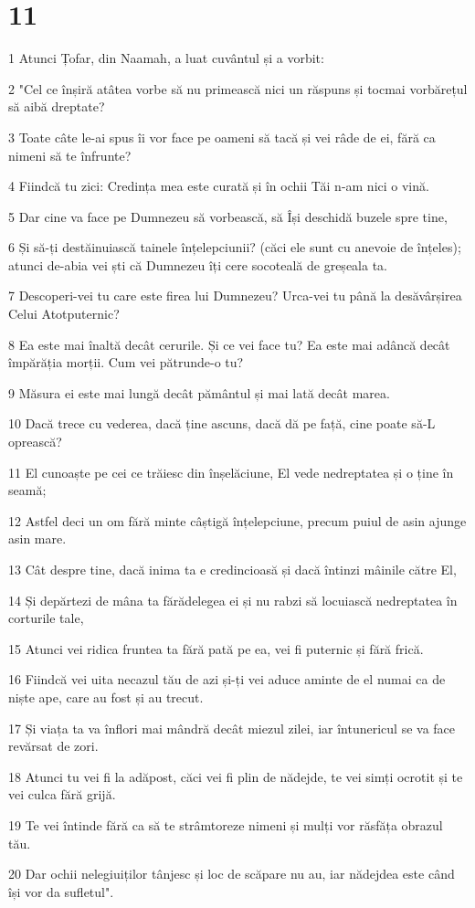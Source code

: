 \chapter{11}

\par 1 Atunci Țofar, din Naamah, a luat cuvântul și a vorbit:
\par 2 "Cel ce înșiră atâtea vorbe să nu primească nici un răspuns și tocmai vorbărețul să aibă dreptate?
\par 3 Toate câte le-ai spus îi vor face pe oameni să tacă și vei râde de ei, fără ca nimeni să te înfrunte?
\par 4 Fiindcă tu zici: Credința mea este curată și în ochii Tăi n-am nici o vină.
\par 5 Dar cine va face pe Dumnezeu să vorbească, să Își deschidă buzele spre tine,
\par 6 Și să-ți destăinuiască tainele înțelepciunii? (căci ele sunt cu anevoie de înțeles); atunci de-abia vei ști că Dumnezeu îți cere socoteală de greșeala ta.
\par 7 Descoperi-vei tu care este firea lui Dumnezeu? Urca-vei tu până la desăvârșirea Celui Atotputernic?
\par 8 Ea este mai înaltă decât cerurile. Și ce vei face tu? Ea este mai adâncă decât împărăția morții. Cum vei pătrunde-o tu?
\par 9 Măsura ei este mai lungă decât pământul și mai lată decât marea.
\par 10 Dacă trece cu vederea, dacă ține ascuns, dacă dă pe față, cine poate să-L oprească?
\par 11 El cunoaște pe cei ce trăiesc din înșelăciune, El vede nedreptatea și o ține în seamă;
\par 12 Astfel deci un om fără minte câștigă înțelepciune, precum puiul de asin ajunge asin mare.
\par 13 Cât despre tine, dacă inima ta e credincioasă și dacă întinzi mâinile către El,
\par 14 Și depărtezi de mâna ta fărădelegea ei și nu rabzi să locuiască nedreptatea în corturile tale,
\par 15 Atunci vei ridica fruntea ta fără pată pe ea, vei fi puternic și fără frică.
\par 16 Fiindcă vei uita necazul tău de azi și-ți vei aduce aminte de el numai ca de niște ape, care au fost și au trecut.
\par 17 Și viața ta va înflori mai mândră decât miezul zilei, iar întunericul se va face revărsat de zori.
\par 18 Atunci tu vei fi la adăpost, căci vei fi plin de nădejde, te vei simți ocrotit și te vei culca fără grijă.
\par 19 Te vei întinde fără ca să te strâmtoreze nimeni și mulți vor răsfăța obrazul tău.
\par 20 Dar ochii nelegiuiților tânjesc și loc de scăpare nu au, iar nădejdea este când își vor da sufletul".

